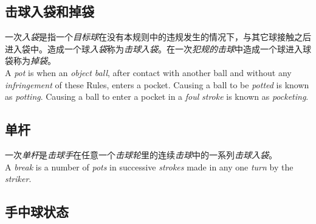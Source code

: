 \subsection{击球入袋和掉袋}

\noindent 一次\emph{入袋}是指一个\emph{目标球}在没有本规则中的{违规}发生的情况下，与其它球接触之后进入袋中。造成一个球\emph{入袋}称为\emph{击球入袋}。在一次\emph{犯规的}\emph{击球}中造成一个球进入球袋称为\emph{掉袋}。\\
A \emph{pot} is when an \emph{object ball}, after contact with another ball and without any \emph{infringement} of these Rules, enters a pocket. Causing a ball to be \emph{potted} is known as \emph{potting}. Causing a ball to enter a pocket in a \emph{foul} \emph{stroke} is known as \emph{pocketing}.

\subsection{单杆}

\noindent 一次\emph{单杆}是\emph{击球手}在任意一个\emph{击球轮}里的连续\emph{击球}中的一系列\emph{击球入袋}。\\
A \emph{break} is a number of \emph{pots} in successive \emph{strokes} made in any one \emph{turn} by the \emph{striker}.

\subsection{手中球状态}


